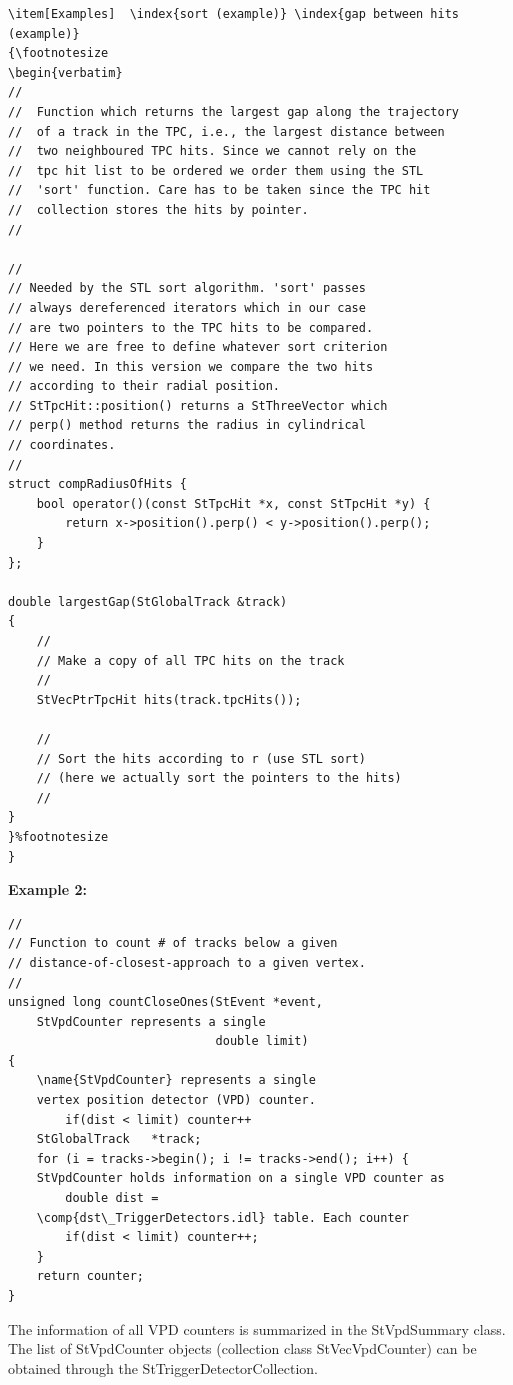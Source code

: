 \begin{Entry}
\begin{Entry}
{\begin{verbatim}
\item[Examples]  \index{sort (example)} \index{gap between hits (example)}
{\footnotesize
\begin{verbatim}
//
//  Function which returns the largest gap along the trajectory
//  of a track in the TPC, i.e., the largest distance between
//  two neighboured TPC hits. Since we cannot rely on the
//  tpc hit list to be ordered we order them using the STL
//  'sort' function. Care has to be taken since the TPC hit
//  collection stores the hits by pointer.
//

//
// Needed by the STL sort algorithm. 'sort' passes
// always dereferenced iterators which in our case
// are two pointers to the TPC hits to be compared.
// Here we are free to define whatever sort criterion
// we need. In this version we compare the two hits
// according to their radial position.
// StTpcHit::position() returns a StThreeVector which
// perp() method returns the radius in cylindrical
// coordinates.
//
struct compRadiusOfHits {
    bool operator()(const StTpcHit *x, const StTpcHit *y) {
        return x->position().perp() < y->position().perp();
    }
};

double largestGap(StGlobalTrack &track)
{
    //
    // Make a copy of all TPC hits on the track
    //
    StVecPtrTpcHit hits(track.tpcHits());

    //
    // Sort the hits according to r (use STL sort)
    // (here we actually sort the pointers to the hits)
    //
}  
}%footnotesize    
}
\end{verbatim}
}%

{\bf Example 2:}
{\footnotesize
\begin{verbatim}
//
// Function to count # of tracks below a given
// distance-of-closest-approach to a given vertex.
//
unsigned long countCloseOnes(StEvent *event,
    StVpdCounter represents a single 
                             double limit)
{
    \name{StVpdCounter} represents a single 
    vertex position detector (VPD) counter.  
        if(dist < limit) counter++
    StGlobalTrack   *track;
    for (i = tracks->begin(); i != tracks->end(); i++) {
    StVpdCounter holds information on a single VPD counter as
        double dist =
    \comp{dst\_TriggerDetectors.idl} table. Each counter
        if(dist < limit) counter++;
    }
    return counter;
}
\end{verbatim}


    The information of all VPD counters is summarized in the StVpdSummary class.
    The list of StVpdCounter objects (collection class StVecVpdCounter) can be obtained
    through the StTriggerDetectorCollection.
}
\end{Entry}
\end{Entry}
